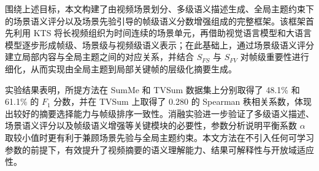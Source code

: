 围绕上述目标，本文构建了由视频场景划分、多级语义描述生成、全局主题约束下的场景语义评分以及场景先验引导的帧级语义分数增强组成的完整框架。该框架首先利用 KTS 将长视频组织为时间连续的场景单元，再借助视觉语言模型和大语言模型逐步形成帧级、场景级与视频级语义表示；在此基础上，通过场景级语义评分建立局部内容与全局主题之间的对应关系，并结合 $S_{FS}$ 与 $S_{FV}$ 对帧级重要性进行细化，从而实现由全局主题到局部关键帧的层级化摘要生成。

实验结果表明，所提方法在 SumMe 和 TVSum 数据集上分别取得了 48.1\% 和 61.1\% 的 $F_1$ 分数，并在 TVSum 上取得了 0.280 的 Spearman 秩相关系数，体现出较好的摘要选择能力与帧级排序一致性。消融实验进一步验证了多级语义描述、场景语义评分以及帧级语义增强等关键模块的必要性，参数分析说明平衡系数 $\alpha$ 取较小值时更有利于兼顾场景先验与全局主题约束。本文方法在不引入任何可学习参数的前提下，有效提升了视频摘要的语义理解能力、结果可解释性与开放域适应性。
